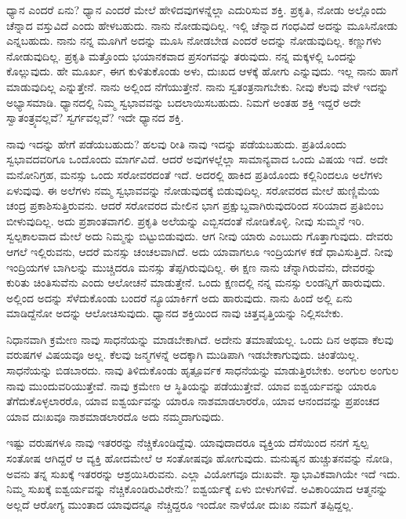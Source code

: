 ಧ್ಯಾನ ಎಂದರೆ ಏನು? ಧ್ಯಾನ ಎಂದರೆ ಮೇಲೆ ಹೇಳಿದವುಗಳನ್ನೆಲ್ಲಾ ಎದುರಿಸುವ ಶಕ್ತಿ. ಪ್ರಕೃತಿ, ನೋಡು ಅಲ್ಲೊಂದು ಚೆನ್ನಾದ ವಸ್ತುವಿದೆ ಎಂದು ಹೇಳಬಹುದು. ನಾನು ನೋಡುವುದಿಲ್ಲ. ಇಲ್ಲಿ ಚೆನ್ನಾದ ಗಂಧವಿದೆ ಅದನ್ನು ಮೂಸಿನೋಡು ಎನ್ನಬಹುದು. ನಾನು ನನ್ನ ಮೂಗಿಗೆ ಅದನ್ನು ಮೂಸಿ ನೋಡಬೇಡ ಎಂದರೆ ಅದನ್ನು ನೋಡುವುದಿಲ್ಲ. ಕಣ್ಣುಗಳು ನೋಡುವುದಿಲ್ಲ. ಪ್ರಕೃತಿ ಮತ್ತೊಂದು ಭಯಾನಕವಾದ ಪ್ರಸಂಗವನ್ನು ತರುವುದು. ನನ್ನ ಮಕ್ಕಳಲ್ಲಿ ಒಂದನ್ನು ಕೊಲ್ಲುವುದು. ಹೇ ಮೂರ್ಖ, ಈಗ ಕುಳಿತುಕೊಂಡು ಅಳು, ದುಃಖದ ಆಳಕ್ಕೆ ಹೋಗು ಎನ್ನುವುದು. ಇಲ್ಲ ನಾನು ಹಾಗೆ ಮಾಡುವುದಿಲ್ಲ ಎನ್ನುತ್ತೇನೆ. ನಾನು ಅಲ್ಲಿಂದ ನೆಗೆಯುತ್ತೇನೆ. ನಾನು ಸ್ವತಂತ್ರನಾಗಬೇಕು. ನೀವು ಕೆಲವು ವೇಳೆ ಇದನ್ನು ಅಭ್ಯಾಸಮಾಡಿ. ಧ್ಯಾನದಲ್ಲಿ ನಿಮ್ಮ ಸ್ವಭಾವವನ್ನು ಬದಲಾಯಿಸಬಹುದು. ನಿಮಗೆ ಅಂತಹ ಶಕ್ತಿ ಇದ್ದರೆ ಅದೇ ಸ್ವಾತಂತ್ರ್ಯವಲ್ಲವೆ? ಸ್ವರ್ಗವಲ್ಲವೆ? ಇದೇ ಧ್ಯಾನದ ಶಕ್ತಿ.

ನಾವು ಇದನ್ನು ಹೇಗೆ ಪಡೆಯಬಹುದು? ಹಲವು ರೀತಿ ನಾವು ಇದನ್ನು ಪಡೆಯಬಹುದು. ಪ್ರತಿಯೊಂದು ಸ್ವಭಾವದವರಿಗೂ ಒಂದೊಂದು ಮಾರ್ಗವಿದೆ. ಆದರೆ ಅವುಗಳಲ್ಲೆಲ್ಲಾ ಸಾಮಾನ್ಯವಾದ ಒಂದು ವಿಷಯ ಇದೆ. ಅದೇ ಮನೋನಿಗ್ರಹ, ಮನಸ್ಸು ಒಂದು ಸರೋವರದಂತೆ ಇದೆ. ಅದರಲ್ಲಿ ಹಾಕಿದ ಪ್ರತಿಯೊಂದು ಕಲ್ಲಿನಿಂದಲೂ ಅಲೆಗಳು ಏಳುವುವು. ಈ ಅಲೆಗಳು ನಮ್ಮ ಸ್ವಭಾವವನ್ನು ನೋಡುವುದಕ್ಕೆ ಬಿಡುವುದಿಲ್ಲ. ಸರೋವರದ ಮೇಲೆ ಹುಣ್ಣಿಮೆಯ ಚಂದ್ರ ಪ್ರಕಾಶಿಸುತ್ತಿರುವನು. ಆದರೆ ಸರೋವರದ ಮೇಲಿನ ಭಾಗ ಪ್ರಕ್ಷುಬ್ದವಾಗಿರುವುದರಿಂದ ಸರಿಯಾದ ಪ್ರತಿಬಿಂಬ ಬೀಳುವುದಿಲ್ಲ. ಅದು ಪ್ರಶಾಂತವಾಗಲಿ. ಪ್ರಕೃತಿ ಅಲೆಯನ್ನು ಎಬ್ಬಿಸದಂತೆ ನೋಡಿಕೊಳ್ಳಿ. ನೀವು ಸುಮ್ಮನೆ ಇರಿ. ಸ್ವಲ್ಪಕಾಲವಾದ ಮೇಲೆ ಅದು ನಿಮ್ಮನ್ನು ಬಿಟ್ಟುಬಿಡುವುದು. ಆಗ ನೀವು ಯಾರು ಎಂಬುದು ಗೊತ್ತಾಗುವುದು. ದೇವರು ಆಗಲೆ ಇಲ್ಲಿರುವನು, ಆದರೆ ಮನಸ್ಸು ಚಂಚಲವಾಗಿದೆ. ಅದು ಯಾವಾಗಲೂ ಇಂದ್ರಿಯಗಳ ಕಡೆ ಧಾವಿಸುತ್ತಿದೆ. ನೀವು ಇಂದ್ರಿಯಗಳ ಬಾಗಿಲನ್ನು ಮುಚ್ಚಿದರೂ ಮನಸ್ಸು ತೆಪ್ಪಗಿರುವುದಿಲ್ಲ. ಈ ಕ್ಷಣ ನಾನು ಚೆನ್ನಾಗಿರುವೆನು, ದೇವರನ್ನು ಕುರಿತು ಚಿಂತಿಸುವೆನು ಎಂದು ಆಲೋಚನೆ ಮಾಡುತ್ತೇನೆ. ಒಂದು ಕ್ಷಣದಲ್ಲಿ ನನ್ನ ಮನಸ್ಸು ಲಂಡನ್ನಿಗೆ ಹಾರುವುದು. ಅಲ್ಲಿಂದ ಅದನ್ನು ಸೆಳೆದುಕೊಂಡು ಬಂದರೆ ನ್ಯೂಯಾರ್ಕಿಗೆ ಅದು ಹಾರುವುದು. ನಾನು ಹಿಂದೆ ಅಲ್ಲಿ ಏನು ಮಾಡಿದ್ದೆನೋ ಅದನ್ನು ಆಲೋಚಿಸುವುದು. ಧ್ಯಾನದ ಶಕ್ತಿಯಿಂದ ನಾವು ಚಿತ್ತವೃತ್ತಿಯನ್ನು ನಿಲ್ಲಿಸಬೇಕು.

ನಿಧಾನವಾಗಿ ಕ್ರಮೇಣ ನಾವು ಸಾಧನೆಯನ್ನು ಮಾಡಬೇಕಾಗಿದೆ. ಅದೇನು ತಮಾಷೆಯಲ್ಲ. ಒಂದು ದಿನ ಅಥವಾ ಕೆಲವು ವರುಷಗಳ ವಿಷಯವೂ ಅಲ್ಲ. ಕೆಲವು ಜನ್ಮಗಳನ್ನೆ ಅದಕ್ಕಾಗಿ ಮುಡಿಪಾಗಿ ಇಡಬೇಕಾಗುವುದು. ಚಿಂತೆಯಿಲ್ಲ. ಸಾಧನೆಯನ್ನು ಬಿಡಬಾರದು. ನಾವು ತಿಳಿದುಕೊಂಡು ಹೃತ್ಪೂರ್ವಕ ಸಾಧನೆಯನ್ನು ಮಾಡುತ್ತಿರಬೇಕು. ಅಂಗುಲ ಅಂಗುಲ ನಾವು ಮುಂದುವರಿಯುತ್ತೇವೆ. ನಾವು ಕ್ರಮೇಣ ಆ ಸ್ಥಿತಿಯನ್ನು ಪಡೆಯುತ್ತೇವೆ. ಯಾವ ಐಶ್ವರ್ಯವನ್ನು ಯಾರೂ ತೆಗೆದುಕೊಳ್ಳಲಾರರೊ, ಯಾವ ಐಶ್ವರ್ಯವನ್ನು ಯಾರೂ ನಾಶಮಾಡಲಾರರೊ, ಯಾವ ಆನಂದವನ್ನು ಪ್ರಪಂಚದ ಯಾವ ದುಃಖವೂ ನಾಶಮಾಡಲಾರದೊ ಅದು ನಮ್ಮದಾಗುವುದು.

ಇಷ್ಟು ವರುಷಗಳೂ ನಾವು ಇತರರನ್ನು ನೆಚ್ಚಿಕೊಂಡಿದ್ದೆವು. ಯಾವುದಾದರೂ ವ್ಯಕ್ತಿಯ ದೆಸೆಯಿಂದ ನನಗೆ ಸ್ವಲ್ಪ ಸಂತೋಷ ಆಗಿದ್ದರೆ ಆ ವ್ಯಕ್ತಿ ಹೋದಮೇಲೆ ಆ ಸಂತೋಷವೂ ಹೋಗುವುದು. ಮನುಷ್ಯನ ಹುಚ್ಚುತನವನ್ನು ನೋಡಿ, ಅವನು ತನ್ನ ಸುಖಕ್ಕೆ ಇತರರನ್ನು ಆಶ್ರಯಿಸಿರುವನು. ಎಲ್ಲಾ ವಿಯೋಗವೂ ದುಃಖವೇ. ಸ್ವಾಭಾವಿಕವಾಗಿಯೇ ಇದೆ ಇದು. ನಿಮ್ಮ ಸುಖಕ್ಕೆ ಐಶ್ವರ್ಯವನ್ನು ನೆಚ್ಚಿಕೊಂಡಿರುವಿರೇನು? ಐಶ್ವರ್ಯಕ್ಕೆ ಏಳು ಬೀಳುಗಳಿವೆ. ಅವಿಕಾರಿಯಾದ ಆತ್ಮನನ್ನು ಅಲ್ಲದೆ ಆರೋಗ್ಯ ಮುಂತಾದ ಯಾವುದನ್ನೂ ನೆಚ್ಚಿದ್ದರೂ ಇಂದೋ ನಾಳೆಯೋ ದುಃಖ ನಮಗೆ ತಪ್ಪಿದ್ದಲ್ಲ.

